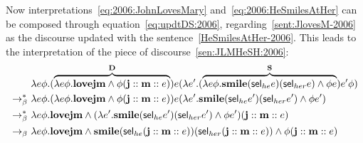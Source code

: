 \begin{example}[$\updt \ \D \ \S$]
Now interpretations~\eqref{eq:2006:JohnLovesMary} and~\eqref{eq:2006:HeSmilesAtHer} can be composed through equation~\eqref{eq:updtDS:2006}, regarding~\eqref{sent:JlovesM-2006} as the discourse updated with the sentence~\eqref{HeSmilesAtHer-2006}. This leads to the interpretation of the piece of discourse~\eqref{sen:JLMHeSH:2006}:
\begin{align}
& \lambda e \phi. (\overbrace{\lambda e \phi.  \textbf{love}  \textbf{j} \textbf{m} \land   \phi (\textbf{j} :: \textbf{m} :: e) }^{\mathbf{D}}  ) e (\lambda e'. (\overbrace{\lambda e \phi.   \textbf{smile}  (\mathsf{sel}_{he}e)  (\mathsf{sel}_{her}e) \land \phi e}^{\mathbf{S}}) e' \phi ) \notag \\
\rightarrow^{*}_\beta \ & \lambda e \phi. (\lambda e \phi.  \textbf{love}  \textbf{j} \textbf{m} \land   \phi (\textbf{j} :: \textbf{m} :: e) ) e (\lambda e'.  \textbf{smile}  (\mathsf{sel}_{he}e')  (\mathsf{sel}_{her}e') \land \phi e' ) \notag \\
\rightarrow^{*}_\beta \ & \lambda e \phi.\textbf{love}  \textbf{j} \textbf{m} \land    (\lambda e'.  \textbf{smile}  (\mathsf{sel}_{he}e')  (\mathsf{sel}_{her}e') \land \phi e' )  (\textbf{j} :: \textbf{m} :: e) \notag \\
\rightarrow_\beta \ & \lambda e \phi.\textbf{love}  \textbf{j} \textbf{m} \land    \textbf{smile}  (\mathsf{sel}_{he}(\textbf{j} :: \textbf{m} :: e))  (\mathsf{sel}_{her}(\textbf{j} :: \textbf{m} :: e)) \land \phi  (\textbf{j} :: \textbf{m} :: e) \label{int:JLMHeSH:2006}
\end{align}
\end{example}

